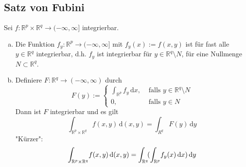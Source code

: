 \subsection{Satz von Fubini} %
\label{sub:73}
Sei $f : \mathds{R}^p \times \mathds{R}^q \to (-\infty, \infty]$ integrierbar. 
\begin{enumerate}[a)]
	\item Die Funktion $f_y : \mathds{R}^p \to (-\infty, \infty]$ mit $f_y(x) := f(x,y)$ ist für fast alle $y \in \mathds{R}^q$ integrierbar, d.h. $f_y$ ist integrierbar für
	$y \in \mathds{R}^q \setminus N$, für eine Nullmenge $N \subset \mathds{R}^q$.
	\item Definiere $F : \mathds{R}^q \to (-\infty,\infty)$ durch
	\[
		F(y) := \begin{cases}
			\int_{\mathds{R}^p}\! f_y  \, \mathrm{d}x , &\text{ falls }y \in \mathds{R}^q \setminus N\\
			0 ,&\text{ falls } y \in N
		\end{cases}
	\]
	Dann ist $F$ integrierbar und es gilt
	\[
		\int_{\mathds{R}^p \times \mathds{R}^q}\! f(x,y)  \, \mathrm{d}(x,y) = \int_{R^q} F(y)  \, \mathrm{d}y
	\]
	"{}Kürzer"{}:
	\[
		\int_{\mathbb{R}^p \times \mathbb{R}^q}\! f(x,y)  \, \mathrm{d}(x,y) = \int_{\mathbb{R}^q}\! (\int_{\mathbb{R}^p}\! f_y(x)  \, \mathrm{d}x )  
		\, \mathrm{d}y 
	\]
\end{enumerate}
